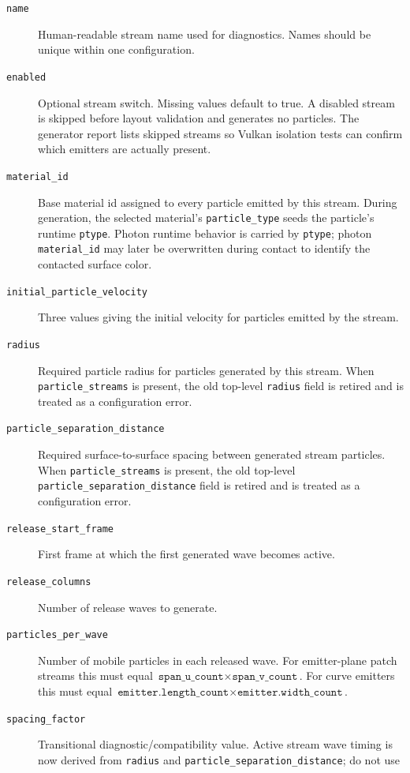 \begin{description}
    \item[\texttt{name}] Human-readable stream name used for diagnostics.
    Names should be unique within one configuration.
    \item[\texttt{enabled}] Optional stream switch.  Missing values default
    to true.  A disabled stream is skipped before layout validation and
    generates no particles.  The generator report lists skipped streams so
    Vulkan isolation tests can confirm which emitters are actually present.
    \item[\texttt{material\_id}] Base material id assigned to every particle
    emitted by this stream.  During generation, the selected material's
    \texttt{particle\_type} seeds the particle's runtime \texttt{ptype}.
    Photon runtime behavior is carried by \texttt{ptype}; photon
    \texttt{material\_id} may later be overwritten during contact to identify
    the contacted surface color.
    \item[\texttt{initial\_particle\_velocity}] Three values giving the
    initial velocity for particles emitted by the stream.
    \item[\texttt{radius}] Required particle radius for particles generated by
    this stream.  When \texttt{particle\_streams} is present, the old
    top-level \texttt{radius} field is retired and is treated as a
    configuration error.
    \item[\texttt{particle\_separation\_distance}] Required
    surface-to-surface spacing between generated stream particles.  When
    \texttt{particle\_streams} is present, the old top-level
    \texttt{particle\_separation\_distance} field is retired and is treated
    as a configuration error.
    \item[\texttt{release\_start\_frame}] First frame at which the first
    generated wave becomes active.
    \item[\texttt{release\_columns}] Number of release waves to generate.
    \item[\texttt{particles\_per\_wave}] Number of mobile particles in each
    released wave.  For emitter-plane patch streams this must equal
    \(\texttt{span\_u\_count} \times \texttt{span\_v\_count}\).  For curve
    emitters this must equal
    \(\texttt{emitter.length\_count} \times
    \texttt{emitter.width\_count}\).
    \item[\texttt{spacing\_factor}] Transitional diagnostic/compatibility
    value.  Active stream wave timing is now derived from
    \texttt{radius} and \texttt{particle\_separation\_distance}; do not use

\end{description}
